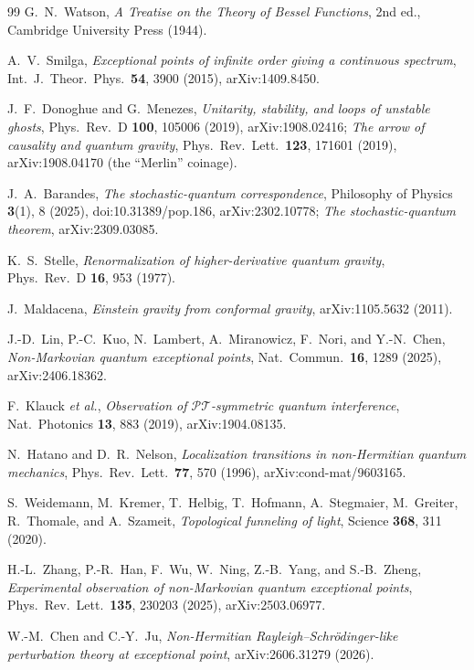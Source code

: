 ﻿\documentclass[11pt]{article}
\newcommand{\PT}{\mathcal{PT}}
\theoremstyle{remark}
\begin{document}
\begin{thebibliography}{99}
G.~N.~Watson,
\emph{A Treatise on the Theory of Bessel Functions},
2nd ed., Cambridge University Press (1944).

A.~V.~Smilga,
\emph{Exceptional points of infinite order giving a continuous
spectrum},
Int.\ J.\ Theor.\ Phys.\ \textbf{54}, 3900 (2015), arXiv:1409.8450.

J.~F.~Donoghue and G.~Menezes,
\emph{Unitarity, stability, and loops of unstable ghosts},
Phys.\ Rev.\ D \textbf{100}, 105006 (2019), arXiv:1908.02416;
\emph{The arrow of causality and quantum gravity},
Phys.\ Rev.\ Lett.\ \textbf{123}, 171601 (2019), arXiv:1908.04170
(the ``Merlin'' coinage).

J.~A.~Barandes,
\emph{The stochastic-quantum correspondence},
Philosophy of Physics \textbf{3}(1), 8 (2025),
doi:10.31389/pop.186,
arXiv:2302.10778;
\emph{The stochastic-quantum theorem}, arXiv:2309.03085.

K.~S.~Stelle,
\emph{Renormalization of higher-derivative quantum gravity},
Phys.\ Rev.\ D \textbf{16}, 953 (1977).

J.~Maldacena,
\emph{Einstein gravity from conformal gravity},
arXiv:1105.5632 (2011).

J.-D.~Lin, P.-C.~Kuo, N.~Lambert, A.~Miranowicz, F.~Nori, and
Y.-N.~Chen,
\emph{Non-Markovian quantum exceptional points},
Nat.\ Commun.\ \textbf{16}, 1289 (2025), arXiv:2406.18362.

F.~Klauck \emph{et al.},
\emph{Observation of $\PT$-symmetric quantum interference},
Nat.\ Photonics \textbf{13}, 883 (2019), arXiv:1904.08135.

N.~Hatano and D.~R.~Nelson,
\emph{Localization transitions in non-Hermitian quantum mechanics},
Phys.\ Rev.\ Lett.\ \textbf{77}, 570 (1996),
arXiv:cond-mat/9603165.

S.~Weidemann, M.~Kremer, T.~Helbig, T.~Hofmann, A.~Stegmaier,
M.~Greiter, R.~Thomale, and A.~Szameit,
\emph{Topological funneling of light},
Science \textbf{368}, 311 (2020).

H.-L.~Zhang, P.-R.~Han, F.~Wu, W.~Ning, Z.-B.~Yang, and
S.-B.~Zheng,
\emph{Experimental observation of non-Markovian quantum exceptional
points},
Phys.\ Rev.\ Lett.\ \textbf{135}, 230203 (2025), arXiv:2503.06977.

W.-M.~Chen and C.-Y.~Ju,
\emph{Non-Hermitian Rayleigh--Schr\"odinger-like perturbation
theory at exceptional point}, arXiv:2606.31279 (2026).


\end{thebibliography}
\end{document}

